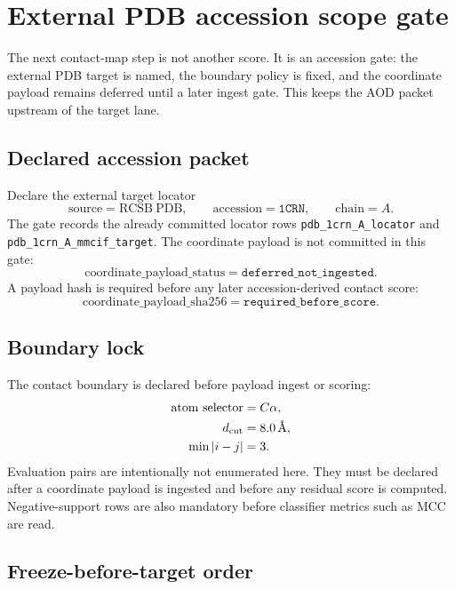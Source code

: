 
\section{External PDB accession scope gate}

The next contact-map step is not another score. It is an accession gate: the external PDB target is named, the boundary policy is fixed, and the coordinate payload remains deferred until a later ingest gate. This keeps the AOD packet upstream of the target lane.

\subsection{Declared accession packet}

Declare the external target locator
\[
  \mathrm{source}=\mathrm{RCSB\ PDB},\qquad
  \mathrm{accession}=\texttt{1CRN},\qquad
  \mathrm{chain}=A.
\]
The gate records the already committed locator rows \texttt{pdb\_1crn\_A\_locator} and \texttt{pdb\_1crn\_A\_mmcif\_target}. The coordinate payload is not committed in this gate:
\[
  \mathrm{coordinate\_payload\_status}=\texttt{deferred\_not\_ingested}.
\]
A payload hash is required before any later accession-derived contact score:
\[
  \mathrm{coordinate\_payload\_sha256}=\texttt{required\_before\_score}.
\]

\subsection{Boundary lock}

The contact boundary is declared before payload ingest or scoring:
\[
\begin{aligned}
  \mathrm{atom\ selector}&=C\alpha,\\
  d_{\rm cut}&=8.0\,\text{\AA},\\
  \min |i-j|&=3.
\end{aligned}
\]
Evaluation pairs are intentionally not enumerated here. They must be declared after a coordinate payload is ingested and before any residual score is computed. Negative-support rows are also mandatory before classifier metrics such as MCC are read.

\subsection{Freeze-before-target order}


